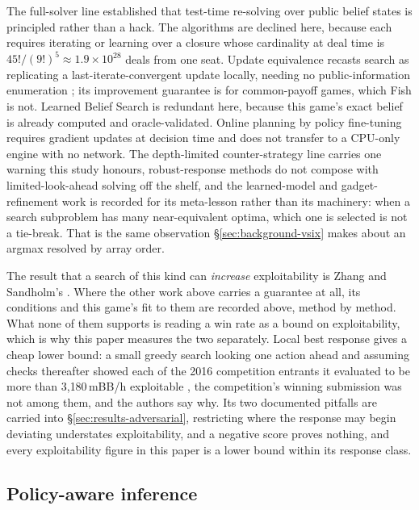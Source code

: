 The full-solver line \cite{moravcik2017deepstack,brown2020rebel,schmid2023sog} established that
test-time re-solving over public belief states is principled rather than a hack. The algorithms are
declined here, because each requires iterating or learning over a closure whose cardinality at deal
time is $45!/(9!)^5 \approx 1.9 \times 10^{28}$ deals from one seat. Update equivalence recasts
search as replicating a last-iterate-convergent update locally, needing no public-information
enumeration \cite{sokota2024updateequivalence}; its improvement guarantee is for common-payoff
games, which Fish is not. Learned Belief Search \cite{hu2021lbs} is redundant here, because this
game's exact belief is already computed and oracle-validated. Online planning by policy fine-tuning
\cite{fickinger2021rlfinetuning} requires gradient updates at decision time and does not transfer to
a CPU-only engine with no network. The depth-limited counter-strategy line
\cite{milec2021cdr,milec2025abd} carries one warning this study honours, robust-response methods
do not compose with limited-look-ahead solving off the shelf, and the learned-model and
gadget-refinement work \cite{kubicek2025lamir,kubicek2026refinements} is recorded for its
meta-lesson rather than its machinery: when a search subproblem has many near-equivalent optima,
which one is selected is not a tie-break. That is the same observation \S\ref{sec:background-vsix}
makes about an argmax resolved by array order.

The result that a search of this kind can \emph{increase} exploitability is Zhang and Sandholm's
\cite{zhang2021subgamesolvingwithoutck}. Where the other work above carries a guarantee at all, its
conditions and this game's fit to them are recorded above, method by method. What none of them
supports is reading a win rate as a bound on exploitability, which is why this paper measures the two
separately. Local best response gives a cheap lower bound: a small greedy search
looking one action ahead and assuming checks thereafter showed each of the 2016 competition entrants
it evaluated to be more than 3{,}180\,mBB/h exploitable \cite{lisy2017lbr}, the competition's
winning submission was not among them, and the authors say why. Its two documented pitfalls are carried into
\S\ref{sec:results-adversarial}, restricting where the response may begin deviating understates
exploitability, and a negative score proves nothing, and every exploitability figure in this
paper is a lower bound within its response class.

\subsection{Policy-aware inference}
\label{sec:related-inference}

